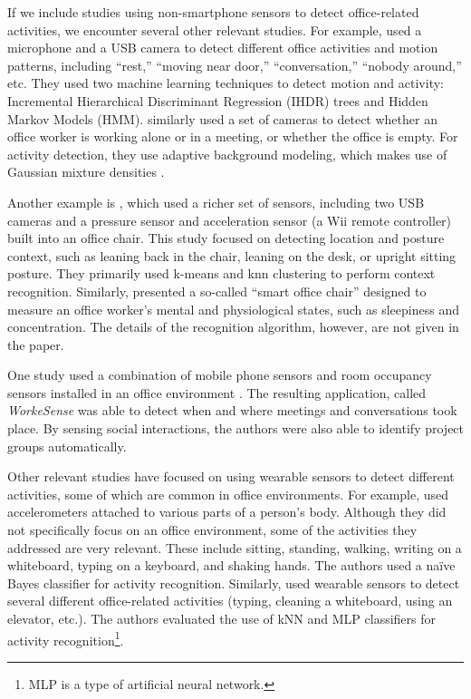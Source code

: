 If we include studies using non-smartphone sensors to detect office-related activities, we encounter several other relevant studies. For example, \cite{huang2004office} %
used a microphone and a USB %
camera to detect different office activities and motion patterns, including ``rest,'' ``moving near door,'' ``conversation,'' ``nobody around,'' etc. They used two machine learning techniques to detect motion and activity: Incremental Hierarchical Discriminant Regression (IHDR) trees and Hidden Markov Models (HMM). \cite{danninger2008context} similarly used a set of cameras to detect whether an office worker is working alone or in a meeting, or whether the office is empty. For activity detection, they use adaptive background modeling, which makes use of Gaussian mixture densities \cite{stauffer1999adaptive}.

Another example is \cite{manabe2010perceptual}, which used a richer set of sensors, including two USB cameras and a pressure sensor and acceleration sensor (a Wii remote controller) built into an office chair. This study focused on detecting location and posture context, such as leaning back in the chair, leaning on the desk, or upright sitting posture. They primarily used k-means and \gls{knn} %
clustering to perform context recognition. Similarly, \cite{kiyokawa2012owens} %
presented a so-called ``smart office chair'' designed to measure an office worker's mental and physiological states, such as sleepiness and concentration. The details of the recognition algorithm, however, are not given in the paper.

One study used a combination of mobile phone sensors and room occupancy sensors installed in an office environment \cite{rachuri2014smartphone}. The resulting application, called \emph{WorkeSense} was able to detect when and where meetings and conversations took place. By sensing social interactions, the authors were also able to identify project groups automatically.

Other relevant studies have focused on using wearable sensors to detect different activities, some of which are common in office environments. For example, \cite{kern2003multi} %
used accelerometers attached to various parts of a person's body. Although they did not specifically focus on an office environment, some of the activities they addressed are very relevant. These include sitting, standing, walking, writing on a whiteboard, typing on a keyboard, and shaking hands. The authors used a na\"{i}ve Bayes classifier for activity recognition. Similarly, \cite{pirttikangas2006feature} used wearable sensors to detect several different office-related activities (typing, cleaning a whiteboard, using an elevator, etc.). The authors evaluated the use of kNN and MLP classifiers for activity recognition\footnote{MLP is a type of artificial neural network.}.


